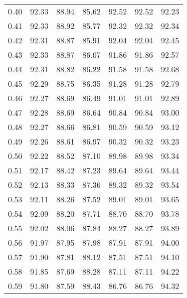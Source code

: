 \begin{tabular}{|c|c|c|c|c|c|c|}
      0.40 &     92.33 &     88.94 &      85.62 &   92.52 &      92.52 &         92.23 \\
      0.41 &     92.33 &     88.92 &      85.77 &   92.32 &      92.32 &         92.34 \\
      0.42 &     92.31 &     88.87 &      85.91 &   92.04 &      92.04 &         92.45 \\
      0.43 &     92.33 &     88.87 &      86.07 &   91.86 &      91.86 &         92.57 \\
      0.44 &     92.31 &     88.82 &      86.22 &   91.58 &      91.58 &         92.68 \\
      0.45 &     92.29 &     88.75 &      86.35 &   91.28 &      91.28 &         92.79 \\
      0.46 &     92.27 &     88.69 &      86.49 &   91.01 &      91.01 &         92.89 \\
      0.47 &     92.28 &     88.69 &      86.64 &   90.84 &      90.84 &         93.00 \\
      0.48 &     92.27 &     88.66 &      86.81 &   90.59 &      90.59 &         93.12 \\
      0.49 &     92.26 &     88.61 &      86.97 &   90.32 &      90.32 &         93.23 \\
      0.50 &     92.22 &     88.52 &      87.10 &   89.98 &      89.98 &         93.34 \\
      0.51 &     92.17 &     88.42 &      87.23 &   89.64 &      89.64 &         93.44 \\
      0.52 &     92.13 &     88.33 &      87.36 &   89.32 &      89.32 &         93.54 \\
      0.53 &     92.11 &     88.26 &      87.52 &   89.01 &      89.01 &         93.65 \\
      0.54 &     92.09 &     88.20 &      87.71 &   88.70 &      88.70 &         93.78 \\
      0.55 &     92.02 &     88.06 &      87.84 &   88.27 &      88.27 &         93.89 \\
      0.56 &     91.97 &     87.95 &      87.98 &   87.91 &      87.91 &         94.00 \\
      0.57 &     91.90 &     87.81 &      88.12 &   87.51 &      87.51 &         94.10 \\
      0.58 &     91.85 &     87.69 &      88.28 &   87.11 &      87.11 &         94.22 \\
      0.59 &     91.80 &     87.59 &      88.43 &   86.76 &      86.76 &         94.32 \\

\end{tabular}
